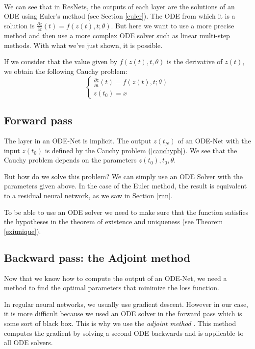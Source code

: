 \documentclass[10pt,a4paper]{article}
\theoremstyle{definition}
\theoremstyle{plain}
\begin{document}
~

We can see that in ResNets, the outputs of each layer are the solutions of an ODE using Euler's method (see Section \ref{euler}). The ODE from which it is a solution is $\frac{\partial z}{\partial t}(t) = f(z(t),t;\theta)$. But here we want to use a more precise method and then use a more complex ODE solver such as linear multi-step methods. With what we've just shown, it is possible.

If we consider that the value given by $f(z(t), t, \theta)$ is the derivative of $z(t)$, we obtain the following Cauchy problem:
\begin{equation}
\label{cauchypb}
\begin{cases}
\frac{\partial z}{\partial t}(t) =  f(z(t), t; \theta) \\
z(t_0) =  x
\end{cases}
\end{equation}


\subsection{Forward pass}

The layer in an ODE-Net is implicit. The output $z(t_N)$ of an ODE-Net with the input $z(t_0)$ is defined by the Cauchy problem (\ref{cauchypb}). We see that the Cauchy problem depends on the parameters $z(t_0),t_0,\theta$.

But how do we solve this problem? We can simply use an ODE Solver with the parameters given above. In the case of the Euler method, the result is equivalent to a residual neural network, as we saw in Section \ref{rnn}.

To be able to use an ODE solver we need to make sure that the function satisfies the hypotheses in the theorem of existence and uniqueness (see Theorem \ref{exiunique}).

\subsection{Backward pass: the Adjoint method}
Now that we know how to compute the output of an ODE-Net, we need a method to find the optimal parameters that minimize the loss function.

In regular neural networks, we usually use gradient descent. However in our case, it is more difficult because we used an ODE solver in the forward pass which is some sort of black box. This is why we use the \textit{adjoint method} \cite{12}. This method computes the gradient by solving a second ODE backwards and is applicable to all ODE solvers.
\end{document}
